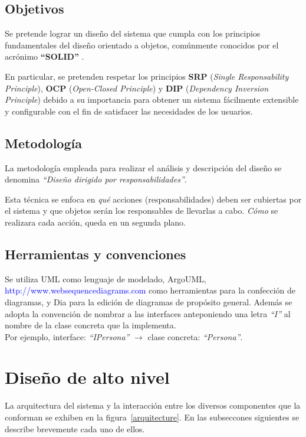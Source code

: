 \documentclass[12pt,a4paper,spanish]{article}
\begin{document}
\subsection{Objetivos}
Se pretende lograr un diseño del sistema que cumpla con los principios
fundamentales del diseño orientado a objetos, comúnmente conocidos por el
acrónimo \textbf{``SOLID''} \cite{martin}.

En particular, se pretenden respetar los principios \textbf{SRP}
(\textit{Single Responsability Principle}), \textbf{OCP} (\textit{Open-Closed
Principle}) y \textbf{DIP} (\textit{Dependency Inversion Principle})
debido a su importancia para obtener un sistema f\'acilmente extensible
y configurable con el fin de satisfacer las necesidades de los usuarios.
  
\subsection{Metodología}
La metodología empleada para realizar el análisis y descripción del
diseño se denomina \emph{``Diseño dirigido por responsabilidades''}\cite{rebecca}. 

Esta técnica se enfoca en \textit{qué} acciones
(responsabilidades) deben ser cubiertas por el sistema 
y que objetos serán los responsables de llevarlas a cabo.
\textit{Cómo} se realizara cada acción, queda en un segunda plano.

\subsection{Herramientas y convenciones}
Se utiliza UML\cite{uml} como lenguaje de modelado, ArgoUML\cite{argoUML}, \\
\textcolor{blue}{http://www.websequencediagrams.com}
como herramientas para la confección de diagramas, y Dia\cite{dia} para la edición
de diagramas de propósito general. Además se adopta la convención de nombrar a
 las interfaces anteponiendo una letra \textit{``I''} al nombre de la clase concreta
que la implementa. \\
Por ejemplo, interface: \textit{``IPersona''} $\to$
clase concreta: \textit{``Persona''}.

\section{Diseño de alto nivel}
\label{highLevel}
La arquitectura del sistema y la interacción entre los diversos componentes que la conforman se exhiben en la figura~\ref{arquitecture}. En las subseccones siguientes se describe brevemente cada uno de ellos.
\end{document}
